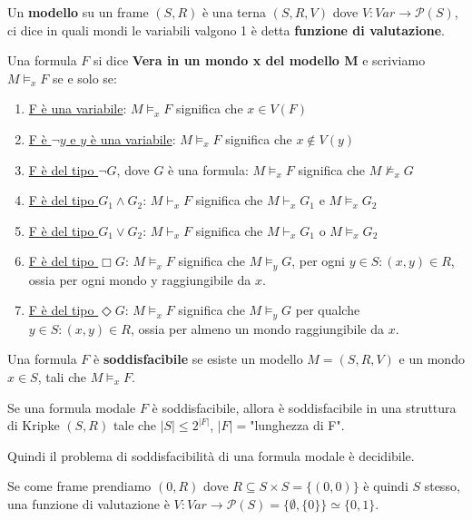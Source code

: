 \documentclass[../main.tex]{subfiles}
\begin{document}
\begin{definition}[Modello]
    Un \textbf{modello} su un frame $(S,R)$ è una terna $(S,R,V)$ dove $V : Var \rightarrow \mathcal{P}(S) $, ci dice in quali mondi le variabili valgono 1 è detta \textbf{funzione di valutazione}.
\end{definition}
\begin{definition}
    Una formula $F$ si dice \textbf{Vera in un mondo x del modello M} e scriviamo $M \vDash_x F$ se e solo se:
    \begin{enumerate}
        \item \underline{F è una variabile}: $M \vDash_x F$ significa che $x \in V(F)$
        \item \underline{ F è $\neg y$ e $y$ è una variabile}: $M \vDash_x F$ significa che $x \notin V(y)$
        \item \underline{F è del tipo $\neg G$}, dove $G$ è una formula: $M \vDash_x F$ significa che $M \nvDash_x G$
        \item \underline{F è del tipo $G_1 \land G_2$}: $M \vdash_x F$ significa che $M \vdash_x G_1$ e $M \vDash_x G_2$
        \item \underline{F è del tipo $G_1 \lor G_2$}: $M \vdash_x F$ significa che $M \vdash_x G_1$ o $M \vDash_x G_2$
        \item \underline{F è del tipo $\Box G$}: $M \vDash_x F$ significa che $M \vDash_y G$, per ogni $y \in S : (x,y) \in R$, ossia per ogni mondo y raggiungibile da $x$.
        \item \underline{F è del tipo $\Diamond G$}: $M \vDash_x F$ significa che $M \vDash_y G$ per qualche $y \in S : (x,y) \in R$, ossia per almeno un mondo raggiungibile da $x$.
    \end{enumerate}
\end{definition}
\begin{definition}[Soddisfacibilità]
    Una formula $F$ è \textbf{soddisfacibile} se esiste un modello $M = (S, R, V)$ e un mondo $x \in S$, tali che $M \vDash_x F$.
\end{definition}
\begin{theorem}
    Se una formula modale $F$ è soddisfacibile, allora è soddisfacibile in una struttura di Kripke $(S,R)$ tale che $|S| \leq 2^{|F|}$, $|F| = $"lunghezza di F".

    Quindi il problema di soddisfacibilità di una formula modale è decidibile.
\end{theorem}

Se come frame prendiamo $({0},R)$ dove $R \subseteq S \times S = \{(0,0)\}$ è quindi $S$ stesso, una funzione di valutazione è $V : Var \rightarrow \mathcal{P}(S) = \{\emptyset, \{0\}\} \simeq \{0,1\}$.
\end{document}
